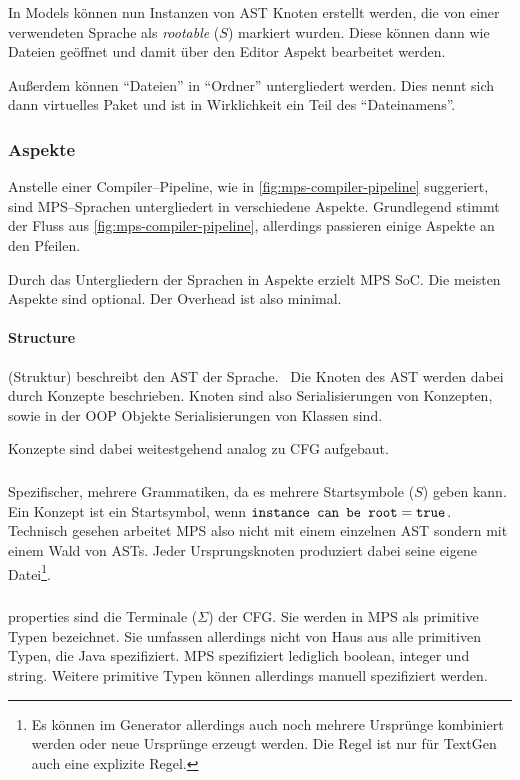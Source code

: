 In Models können nun Instanzen von \ac{AST} Knoten erstellt werden, die von einer verwendeten Sprache als \textit {rootable} ($S$) markiert wurden.
Diese können dann wie Dateien geöffnet und damit über den Editor Aspekt bearbeitet werden.

Außerdem können \enquote{Dateien} in \enquote{Ordner} untergliedert werden.
Dies nennt sich dann virtuelles Paket und ist in Wirklichkeit ein Teil des \enquote{Dateinamens}.

\subsubsection{Aspekte}\label{subsubsec:aspekte}
Anstelle einer Compiler--Pipeline, wie in \autoref{fig:mps-compiler-pipeline} suggeriert, sind \acs{MPS}--Sprachen untergliedert in verschiedene Aspekte.
Grundlegend stimmt der Fluss aus \autoref{fig:mps-compiler-pipeline}, allerdings passieren einige Aspekte an den Pfeilen.

Durch das Untergliedern der Sprachen in Aspekte erzielt \ac{MPS} \ac{SoC}.
Die meisten Aspekte sind optional.
Der Overhead ist also minimal.

\paragraph{Structure} (Struktur) beschreibt den \ac{AST} der Sprache.~\autocite{jetbrains-sro-no-dateG}
Die Knoten des \ac{AST} werden dabei durch Konzepte beschrieben.
Knoten sind also Serialisierungen von Konzepten, sowie in der \ac{OOP} Objekte Serialisierungen von Klassen sind.


Konzepte sind dabei weitestgehend analog zu \ac{CFG} aufgebaut.

\subparagraph*{}
Spezifischer, mehrere Grammatiken, da es mehrere Startsymbole ($S$) geben kann.
Ein Konzept ist ein Startsymbol, wenn $\text{\ttfamily instance can be root}=\text{\ttfamily true}$.
Technisch gesehen arbeitet \ac{MPS} also nicht mit einem einzelnen \ac{AST} sondern mit einem Wald von \acp{AST}.
Jeder Ursprungsknoten produziert dabei seine eigene Datei\footnote{Es können im Generator allerdings auch noch mehrere Ursprünge kombiniert werden oder neue Ursprünge erzeugt werden. Die Regel ist nur für TextGen auch eine explizite Regel.}.

\subparagraph*{}
{\ttfamily properties} sind die Terminale ($\Sigma$) der \ac{CFG}.
Sie werden in \ac{MPS} als primitive Typen bezeichnet.
Sie umfassen allerdings nicht von Haus aus alle primitiven Typen, die Java spezifiziert.
\ac{MPS} spezifiziert lediglich {\ttfamily boolean}, {\ttfamily integer} und {\ttfamily string}.
Weitere primitive Typen können allerdings manuell spezifiziert werden.

